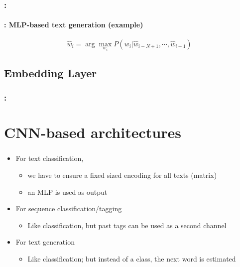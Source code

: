 \documentclass[xcolor=table]{beamer}
\begin{document}
\begin{frame}
	\frametitle{\insertshortsubtitle: \insertsection}
	\framesubtitle{\insertsubsection: MLP-based text generation (example)}
	
	\[\hat{w}_i = \arg\max\limits_{w_i} P(w_i | \hat{w}_{i-N+1}, \cdots, \hat{w}_{i-1})\]
	
	\begin{center}
	\end{center}
	
\end{frame}

\subsection{Embedding Layer}

\begin{frame}
	\frametitle{\insertshortsubtitle: \insertsection}
	\framesubtitle{\insertsubsection}
	
	
	
\end{frame}


\section{CNN-based architectures}

\begin{frame}
	\frametitle{\insertshortsubtitle}
	\framesubtitle{\insertsection}
	
	\begin{itemize}
		\item For text classification, 
		\begin{itemize}
			\item we have to ensure a fixed sized encoding for all texts (matrix)
			\item an MLP is used as output 
		\end{itemize}
		\item For sequence classification/tagging
		\begin{itemize}
			\item Like classification, but past tags can be used as a second channel 
		\end{itemize}
		\item For text generation
		\begin{itemize}
			\item Like classification; but instead of a class, the next word is estimated
		\end{itemize}
	\end{itemize}
	
\end{frame}
\end{document}

